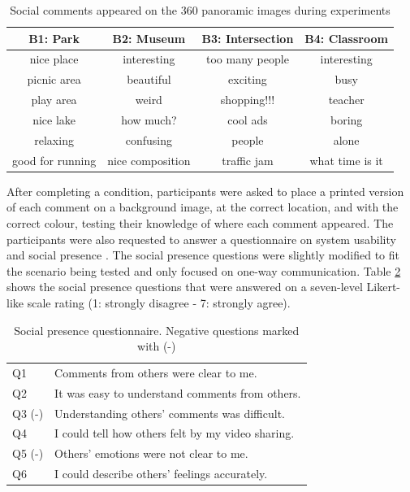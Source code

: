 \begin{table}[h]
  \centering
  \caption{Social comments appeared on the 360 panoramic images during experiments}
  \label{table:mgia16:comment}
  \begin{tabular}{ |c|c|c|c| } 
\hline
    B1: Park    & B2: Museum  &   B3: Intersection    &  B4: Classroom\\
\hline
    nice place  &   interesting &  too many people & interesting \\
    picnic area &   beautiful   &  exciting  & busy \\
    play area   &   weird   &  shopping!!! & teacher \\
    nice lake   &   how much?    &  cool ads    & boring \\
    relaxing    &   confusing   &  people    & alone \\
    good for running    &   nice composition    &  traffic jam & what time is it\\\hline
  \end{tabular}
\end{table}

After completing a condition, participants were asked to place a printed version of each comment on a background image, at the correct location, and with the correct colour, testing their knowledge of where each comment appeared. The participants were also requested to answer a questionnaire on system usability \cite{brooke1996sus} and social presence \cite{Harms2004}. The social presence questions were slightly modified to fit the scenario being tested and only focused on one-way communication. Table \ref{table:social_questions} shows the social presence questions that were answered on a seven-level Likert-like scale rating (1: strongly disagree - 7: strongly agree). 

\begin{table}[h]
  \centering
  \caption{Social presence questionnaire. Negative questions marked with (-)}
  \label{table:social_questions}
  \begin{tabular}{ll}
    Q1 & Comments from others were clear to me.          \\
    Q2 & It was easy to understand comments from others. \\
    Q3 (-) & Understanding others' comments was difficult.  \\
    Q4 & I could tell how others felt by my video sharing.\\
    Q5 (-) & Others' emotions were not clear to me.\\
    Q6 & I could describe others' feelings accurately.
  \end{tabular}
\end{table}

